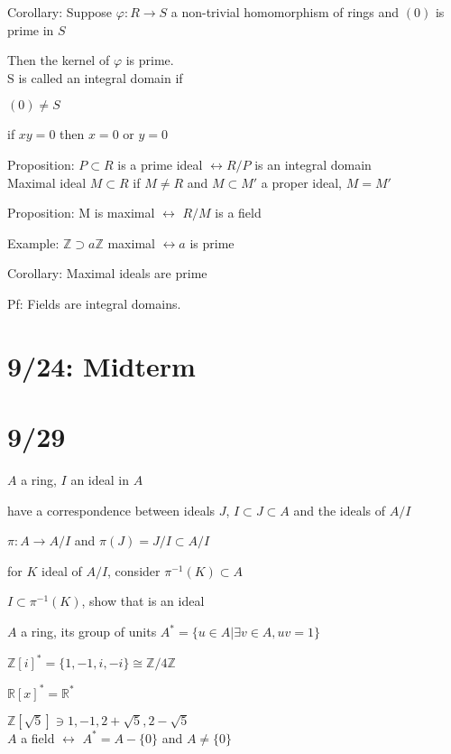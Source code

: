 \documentclass[12pt]{article}
\begin{document}
\noindent
Corollary: Suppose $\varphi: R \to S$ a non-trivial homomorphism of rings and $(0)$ is prime in $S$

Then the kernel of $\varphi$ is prime.\\

\noindent
S is called an integral domain if 

$(0) \neq S$

if $xy = 0$ then $x = 0$ or $y = 0$

\noindent
Proposition: $P \subset R$ is a prime ideal $\leftrightarrow R/P$ is an integral domain\\

\noindent
Maximal ideal $M \subset R$ if $M \neq R$ and $M \subset M'$ a proper ideal, $M = M'$

\noindent
Proposition: M is maximal $\leftrightarrow$ $R/M$ is a field

\noindent
Example: $\mathds{Z} \supset a\mathds{Z}$ maximal $\leftrightarrow a$ is prime

\noindent
Corollary: Maximal ideals are prime

Pf: Fields are integral domains.

\section{9/24: Midterm}

\section{9/29}

\noindent
$A$ a ring, $I$ an ideal in $A$

have a correspondence between ideals $J$, $I \subset J \subset A$ and the ideals of $A/I$

$\pi: A \to A/I$ and $\pi(J) = J/I \subset A/I$

for $K$ ideal of $A/I$, consider $\pi^{-1}(K) \subset A$

$I \subset \pi^{-1}(K)$, show that is an ideal

\noindent
$A$ a ring, its group of units $A^* = \{u \in A | \exists v \in A, uv = 1\}$

$\mathds{Z}[i]^* = \{1, -1, i, -i\} \cong \mathds{Z}/4\mathds{Z}$

$\mathds{R}[x]^* = \mathds{R}^*$

$\mathds{Z}[\sqrt{5}] \ni 1, -1, 2 + \sqrt{5}, 2 - \sqrt{5}$\\

\noindent
$A$ a field $\leftrightarrow$ $A^* = A - \{0\}$ and $A \neq \{0\}$
\end{document}
